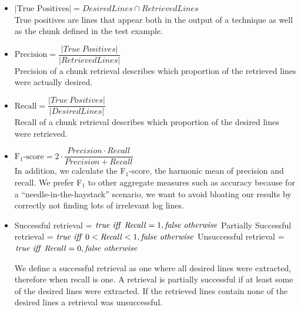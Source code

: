 \vspace{0.2cm}
\begin{itemize}[leftmargin=0.4cm] \itemsep1em
	\item $|\mbox{True\ Positives}| = \mathit{DesiredLines} \cap
	\mathit{RetrievedLines}$ \vspace{0.2cm}\\
	True positives are lines that appear both in the output of a
	technique as well as the chunk defined in the
  test example.


	\item $\mbox{Precision} = \dfrac{|\mathit{True\
	Positives}|}{|\mathit{RetrievedLines}|}$ \vspace{0.21cm} \\
	Precision of a chunk retrieval describes which proportion of
	the retrieved lines were actually desired.

	\item $\mbox{Recall} =
	\dfrac{|\mathit{True\ Positives}|}{|\mathit{DesiredLines}|}$
	\vspace{0.2cm} \\
	Recall of a chunk retrieval describes which proportion of the
	desired lines were retrieved.

	\item $\mbox{F$_{1}$-score} = 2 \cdot \dfrac{\mathit{Precision}
	\cdot \mathit{Recall}}{\mathit{Precision} + \mathit{Recall}}$
	\vspace{0.2cm}\\
	In addition, we calculate the F$_{1}$-score, the harmonic mean
	of precision and recall.
  We prefer F$_{1}$ to other aggregate
	measures such as accuracy because for a
	``needle-in-the-haystack'' scenario, we want to avoid bloating
	our results by correctly not finding lots of irrelevant log
	lines.

	\item Successful retrieval = $\mathit{true}\ \mathit{iff}\
	\mathit{Recall} = 1, \mathit{false\ otherwise}\vspace{0.1cm}$
	Partially Successful retrieval = $\mathit{true}\ \mathit{iff}\
	0 < \mathit{Recall} < 1, \mathit{false\ otherwise}\vspace{0.1cm}$
	Unsuccessful retrieval = $\mathit{true}\ \mathit{iff}\
	\mathit{Recall} = 0, \mathit{false\ otherwise}\vspace{0.1cm}$

	We define a successful retrieval as one where all desired
	lines were extracted, therefore when recall is one.
	A retrieval is partially successful if at least some of the
	desired lines were extracted.
	If the retrieved lines contain none of the desired lines
	a retrieval was unsuccessful.
\end{itemize}

